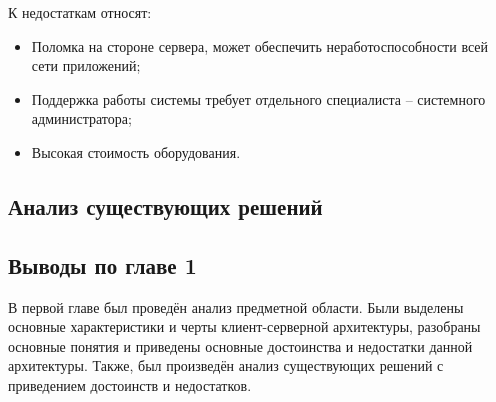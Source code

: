 К недостаткам относят:

\begin{itemize}
    \item Поломка на стороне сервера, может обеспечить неработоспособности всей сети приложений;
    \item Поддержка работы системы требует отдельного специалиста – системного администратора;
    \item Высокая стоимость оборудования.
\end{itemize}

\subsection{Анализ существующих решений}\label{subsec:1-analisis} \indent


\subsection{Выводы по главе 1}\label{subsec:1-conclusion}\indent

В первой главе был проведён анализ предметной области.
Были выделены основные характеристики и черты клиент-серверной архитектуры, разобраны основные понятия и приведены основные достоинства и недостатки данной архитектуры.
Также, был произведён анализ существующих решений с приведением достоинств и недостатков.
